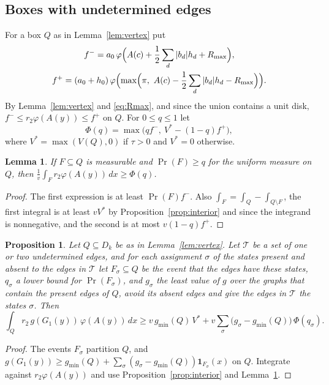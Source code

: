 \documentclass[11pt]{amsart}
\newtheorem{lemma}[theorem]{Lemma}
\newtheorem{proposition}[theorem]{Proposition}
\theoremstyle{definition}
\theoremstyle{remark}
\numberwithin{equation}{section}
\newcommand{\gmin}{g_{\min}}
\begin{document}
\subsection{Boxes with undetermined edges}\label{sec:undet}
For a box $Q$ as in Lemma~\ref{lem:vertex} put
\begin{gather*}
f^-=a_0\,\varphi\Bigl(A(c)+\frac12\sum_d|b_d|h_d+R_{\max}\Bigr),\\
f^+=(a_0+h_0)\,\varphi\Bigl(\max\Bigl(\pi,\ A(c)-\frac12\sum_d|b_d|h_d-R_{\max}\Bigr)\Bigr).
\end{gather*}
By Lemma~\ref{lem:vertex} and \eqref{eq:Rmax}, and since the union contains a unit disk, $f^-\le r_2\varphi(A(y))\le f^+$ on $Q$. For $0\le q\le1$ let
\[
\Phi(q)=\max\bigl(q f^-,\ V^*-(1-q)f^+\bigr),
\]
where $V^*=\max(V(Q),0)$ if $\tau>0$ and $V^*=0$ otherwise.

\begin{lemma}\label{lem:event}
If $F\subseteq Q$ is measurable and $\Pr(F)\ge q$ for the uniform measure on $Q$, then $\frac1v\int_{F}r_2\varphi(A(y))\,dx\ge\Phi(q)$.
\end{lemma}

\begin{proof}
The first expression is at least $\Pr(F)f^-$. Also $\int_F=\int_Q-\int_{Q\setminus F}$, the first integral is at least $vV^*$ by Proposition~\ref{prop:interior} and since the integrand is nonnegative, and the second is at most $v(1-q)f^+$.
\end{proof}

\begin{proposition}\label{prop:boundary}
Let $Q\subseteq D_k$ be as in Lemma~\textup{\ref{lem:vertex}}. Let $\mathcal T$ be a set of one or two undetermined edges, and for each assignment $\sigma$ of the states present and absent to the edges in $\mathcal T$ let $F_\sigma\subseteq Q$ be the event that the edges have these states, $q_\sigma$ a lower bound for $\Pr(F_\sigma)$, and $g_\sigma$ the least value of $g$ over the graphs that contain the present edges of $Q$, avoid its absent edges and give the edges in $\mathcal T$ the states $\sigma$. Then
\[
\int_Qr_2\,g(G_1(y))\,\varphi(A(y))\,dx\ge v\,\gmin(Q)\,V^*+v\sum_\sigma\bigl(g_\sigma-\gmin(Q)\bigr)\,\Phi(q_\sigma).
\]
\end{proposition}

\begin{proof}
The events $F_\sigma$ partition $Q$, and $g(G_1(y))\ge\gmin(Q)+\sum_\sigma(g_\sigma-\gmin(Q))\mathbf 1_{F_\sigma}(x)$ on $Q$. Integrate against $r_2\varphi(A(y))$ and use Proposition~\ref{prop:interior} and Lemma~\ref{lem:event}.
\end{proof}
\end{document}
